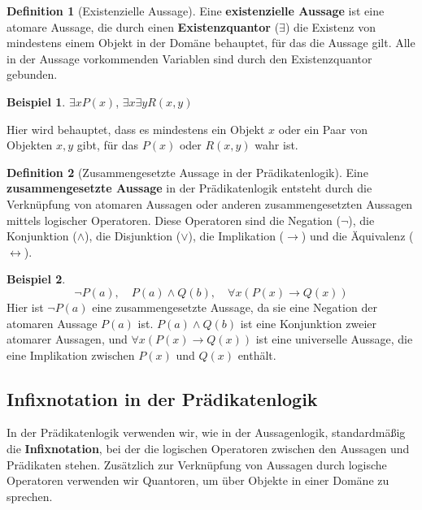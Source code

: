 \documentclass{book}
\theoremstyle{plain}
\theoremstyle{remark}
\theoremstyle{definition}
\newtheorem{definition}{Definition}[section]
\newtheorem*{example}{Beispiel}
\begin{document}
\begin{definition}[Existenzielle Aussage]
Eine \textbf{existenzielle Aussage} ist eine atomare Aussage, die durch einen \textbf{Existenzquantor} (\(\exists\)) die Existenz von mindestens einem Objekt in der Domäne behauptet, für das die Aussage gilt. Alle in der Aussage vorkommenden Variablen sind durch den Existenzquantor gebunden.

\begin{example}
    \(\exists x P(x)\), \quad \(\exists x \exists y R(x, y)\)
\end{example}

Hier wird behauptet, dass es mindestens ein Objekt \(x\) oder ein Paar von Objekten \(x, y\) gibt, für das \(P(x)\) oder \(R(x, y)\) wahr ist.
\end{definition}

\begin{definition}[Zusammengesetzte Aussage in der Prädikatenlogik]
Eine \textbf{zusammengesetzte Aussage} in der Prädikatenlogik entsteht durch die Verknüpfung von atomaren Aussagen oder anderen zusammengesetzten Aussagen mittels logischer Operatoren. Diese Operatoren sind die Negation (\(\neg\)), die Konjunktion (\(\land\)), die Disjunktion (\(\lor\)), die Implikation (\(\rightarrow\)) und die Äquivalenz (\(\leftrightarrow\)).

\begin{example}
\[
\neg P(a), \quad P(a) \land Q(b), \quad \forall x (P(x) \rightarrow Q(x))
\]
Hier ist \(\neg P(a)\) eine zusammengesetzte Aussage, da sie eine Negation der atomaren Aussage \(P(a)\) ist. \(P(a) \land Q(b)\) ist eine Konjunktion zweier atomarer Aussagen, und \(\forall x (P(x) \rightarrow Q(x))\) ist eine universelle Aussage, die eine Implikation zwischen \(P(x)\) und \(Q(x)\) enthält.
\end{example}
\end{definition}

\subsection{Infixnotation in der Prädikatenlogik}

In der Prädikatenlogik verwenden wir, wie in der Aussagenlogik, standardmäßig die \textbf{Infixnotation}, bei der die logischen Operatoren zwischen den Aussagen und Prädikaten stehen. Zusätzlich zur Verknüpfung von Aussagen durch logische Operatoren verwenden wir Quantoren, um über Objekte in einer Domäne zu sprechen. 
\end{document}
